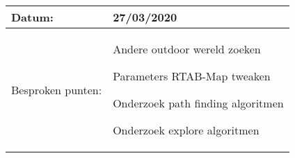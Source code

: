 \begin{tabularx}{\textwidth}{| l | X |}
  \hline
  Datum: & 27/03/2020\\
  \hline
  Besproken punten: &
  \begin{compactitem}
    \item Andere outdoor wereld zoeken
    \item Parameters RTAB-Map tweaken
    \item Onderzoek path finding algoritmen
    \item Onderzoek explore algoritmen
  \end{compactitem}\\
  \hline
\end{tabularx}